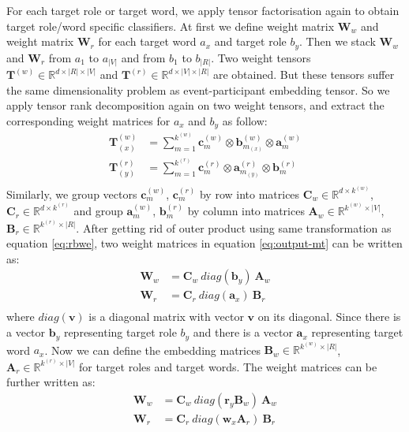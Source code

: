 \documentclass[a4paper]{article}
\begin{document}
For each target role or target word, we apply tensor factorisation again to obtain target role/word specific classifiers. At first we define weight matrix $\mathbf{W}_w$ and weight matrix $\mathbf{W}_r$ for each target word $a_x$ and target role $b_y$. Then we stack $\mathbf{W}_w$ and $\mathbf{W}_r$ from $a_1$ to $a_{|V|}$ and from $b_1$ to $b_{|R|}$. Two weight tensors $\mathbf{T}^{(w)} \in \mathbb{R}^{d \times |R| \times |V|}$ and $\mathbf{T}^{(r)} \in \mathbb{R}^{d \times |V| \times |R|}$ are obtained. But these tensors suffer the same dimensionality problem as event-participant embedding tensor. So we apply tensor rank decomposition again on two weight tensors, and extract the corresponding weight matrices for $a_x$ and $b_y$ as follow: 
\begin{equation} \label{eq:trd-mt-cls}
\begin{aligned}
    \mathbf{T}_{(x)}^{(w)}
        &= \sum_{m=1}^{k^{(w)}} \mathbf{c}_{m}^{(w)} \otimes \mathbf{b}_{m_{(x)}}^{(w)} \otimes \mathbf{a}_m^{(w)} \\
    \mathbf{T}_{(y)}^{(r)}
        &= \sum_{m=1}^{k^{(r)}} \mathbf{c}_{m}^{(r)} \otimes  \mathbf{a}_{m_{(y)}}^{(r)} \otimes \mathbf{b}_m^{(r)} \\
\end{aligned}
\end{equation}
Similarly, we group vectors $\mathbf{c}_{m}^{(w)}$, $\mathbf{c}_{m}^{(r)}$ by row into matrices $\mathbf{C}_w \in \mathbb{R}^{d \times k^{(w)}}$, $\mathbf{C}_r \in \mathbb{R}^{d \times k^{(r)}}$ and group $\mathbf{a}_m^{(w)}$, $\mathbf{b}_m^{(r)}$ by column into matrices $\mathbf{A}_w \in \mathbb{R}^{k^{(w)} \times |V|}$, $\mathbf{B}_r \in \mathbb{R}^{k^{(r)} \times |R|}$. After getting rid of outer product using same transformation as equation \eqref{eq:rbwe}, two weight matrices in equation \eqref{eq:output-mt}  can be written as: 
\begin{equation} \label{eq:cls-mt}
\begin{aligned}
    \mathbf{W}_w
        &= \mathbf{C}_w \ diag(\mathbf{b}_y) \ \mathbf{A}_w \\
    \mathbf{W}_r
        &= \mathbf{C}_r \ diag(\mathbf{a}_x) \ \mathbf{B}_r \\
\end{aligned}
\end{equation}
where $diag(\mathbf{v})$ is a diagonal matrix with vector $\mathbf{v}$ on its diagonal. Since there is a vector $\mathbf{b}_y$ representing target role $b_y$ and there is a vector $\mathbf{a}_x$ representing target word $a_x$. Now we can define the embedding matrices $\mathbf{B}_w \in \mathbb{R}^{k^{(w)} \times |R|}$, $\mathbf{A}_r \in \mathbb{R}^{k^{(r)} \times |V|}$ for target roles and target words. The weight matrices can be further written as: 
\begin{equation} \label{eq:cls-mt-temb}
\begin{aligned}
    \mathbf{W}_w
        &= \mathbf{C}_w \ diag(\mathbf{r}_y \mathbf{B}_w) \ \mathbf{A}_w \\
    \mathbf{W}_r
        &= \mathbf{C}_r \ diag(\mathbf{w}_x \mathbf{A}_r) \ \mathbf{B}_r \\
\end{aligned}
\end{equation}
\end{document}

